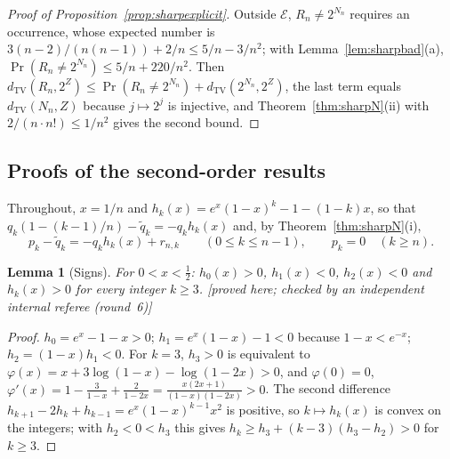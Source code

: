 \documentclass[11pt,a4paper]{article}
\theoremstyle{plain}
\newtheorem{lemma}[theorem]{Lemma}
\theoremstyle{definition}
\theoremstyle{remark}
\newcommand{\status}[1]{\textsf{\small [#1]}}
\begin{document}
\begin{proof}[Proof of Proposition~\ref{prop:sharpexplicit}]
Outside $\mathcal E$, $R_n\ne2^{N_n}$ requires an occurrence, whose expected number is $3(n-2)/(n(n-1))+2/n\le5/n-3/n^2$; with Lemma~\ref{lem:sharpbad}(a), $\Pr(R_n\ne2^{N_n})\le5/n+220/n^2$. Then $d_{\mathrm{TV}}(R_n,2^Z)\le\Pr(R_n\ne2^{N_n})+d_{\mathrm{TV}}(2^{N_n},2^Z)$, the last term equals $d_{\mathrm{TV}}(N_n,Z)$ because $j\mapsto2^j$ is injective, and Theorem~\ref{thm:sharpN}(ii) with $2/(n\cdot n!)\le1/n^2$ gives the second bound.
\end{proof}

\subsection*{Proofs of the second-order results}
Throughout, $x=1/n$ and $h_k(x)=e^x(1-x)^k-1-(1-k)x$, so that $q_k(1-(k-1)/n)-\tilde q_k=-q_kh_k(x)$ and, by Theorem~\ref{thm:sharpN}(i),
\begin{equation}\label{eq:pkqk}
p_k-\tilde q_k=-q_kh_k(x)+r_{n,k}\qquad(0\le k\le n-1),\qquad p_k=0\quad(k\ge n).
\end{equation}

\begin{lemma}[Signs]\label{lem:signs}
For $0<x<\tfrac12$: $h_0(x)>0$, $h_1(x)<0$, $h_2(x)<0$ and $h_k(x)>0$ for every integer $k\ge3$. \status{proved here; checked by an independent internal referee (round~6)}
\end{lemma}

\begin{proof}
$h_0=e^x-1-x>0$; $h_1=e^x(1-x)-1<0$ because $1-x<e^{-x}$; $h_2=(1-x)h_1<0$. For $k=3$, $h_3>0$ is equivalent to $\varphi(x)=x+3\log(1-x)-\log(1-2x)>0$, and $\varphi(0)=0$, $\varphi'(x)=1-\frac3{1-x}+\frac2{1-2x}=\frac{x(2x+1)}{(1-x)(1-2x)}>0$. The second difference $h_{k+1}-2h_k+h_{k-1}=e^x(1-x)^{k-1}x^2$ is positive, so $k\mapsto h_k(x)$ is convex on the integers; with $h_2<0<h_3$ this gives $h_k\ge h_3+(k-3)(h_3-h_2)>0$ for $k\ge3$.
\end{proof}
\end{document}
